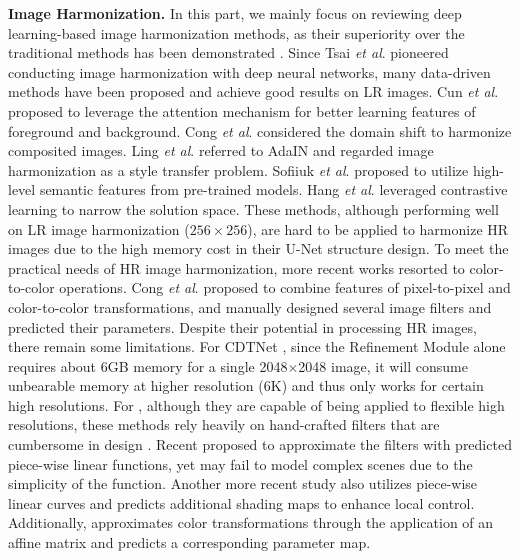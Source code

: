 \documentclass[10pt,journal,twocolumn,twoside]{IEEEtran}
\newcommand{\etal}{\textit{et al}. }
\begin{document}
\textbf{Image Harmonization.} In this part, we mainly focus on reviewing deep learning-based image harmonization methods, as their superiority over the traditional methods\cite{lalonde2007using, xue2012understanding, reinhard2001color, pitie2005n, sunkavalli2010multi} has been demonstrated \cite{tsai2017deep}.  Since Tsai \etal \cite{tsai2017deep} pioneered conducting image harmonization with deep neural networks,  many data-driven methods\cite{cun2020improving, cong2020dovenet, guo2021image, ling2021region, sofiiuk2021foreground, hang2022scs} have been proposed and achieve good results on LR images. Cun \etal \cite{cun2020improving} proposed to leverage the attention mechanism for better learning features of foreground and background. Cong \etal \cite{cong2020dovenet} considered the domain shift to harmonize composited images. Ling \etal \cite{ling2021region} referred to AdaIN\cite{huang2017arbitrary} and regarded image harmonization as a style transfer problem. Sofiiuk \etal \cite{sofiiuk2021foreground} proposed to utilize high-level semantic features from pre-trained models. Hang \etal \cite{hang2022scs} leveraged contrastive learning to narrow the solution space.  These methods, although performing well on LR image harmonization ($256\times256$), are hard to be applied to harmonize HR images due to the high memory cost in their U-Net\cite{ronneberger2015u} structure design.  To meet the practical needs of HR image harmonization, more recent works \cite{cong2022high, ke2022harmonizer, xue2022dccf, liang2022spatial, wang2023semi, guerreiro2023pct} resorted to color-to-color operations. Cong \etal \cite{cong2022high} proposed to combine features of pixel-to-pixel and color-to-color transformations, and \cite{ke2022harmonizer, xue2022dccf} manually designed several image filters and predicted their parameters. Despite their potential in processing HR images, there remain some limitations. For CDTNet \cite{cong2022high}, since the Refinement Module alone requires about 6GB memory for a single 2048$\times$2048 image, it will consume unbearable memory at higher resolution (\eg 6K) and thus only works for certain high resolutions. For \cite{ke2022harmonizer, xue2022dccf}, although they are capable of being applied to flexible high resolutions, these methods rely heavily on hand-crafted filters that are cumbersome in design \cite{ke2022harmonizer, xue2022dccf}. Recent \cite{liang2022spatial} proposed to approximate the filters with predicted piece-wise linear functions, yet may fail to model complex scenes due to the simplicity of the function. Another more recent study \cite{wang2023semi} also utilizes piece-wise linear curves and predicts additional shading maps to enhance local control. Additionally, \cite{guerreiro2023pct} approximates color transformations through the application of an affine matrix and predicts a corresponding parameter map.
\end{document}
